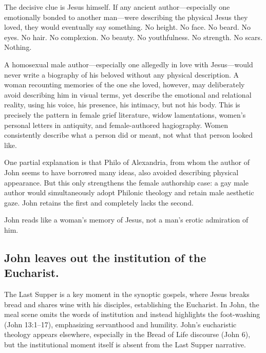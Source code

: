 The decisive clue is Jesus himself.
If any ancient author---especially one emotionally bonded to another man---were describing the physical Jesus they loved, they would eventually say something.
No height.
No face.
No beard.
No eyes.
No hair.
No complexion.
No beauty.
No youthfulness.
No strength.
No scars.
Nothing.

A homosexual male author---especially one allegedly in love with Jesus---would never write a biography of his beloved without any physical description.
A woman recounting memories of the one she loved, however, may deliberately avoid describing him in visual terms, yet describe the emotional and relational reality, using his voice, his presence, his intimacy, but not his body.
This is precisely the pattern in female grief literature, widow lamentations, women's personal letters in antiquity, and female-authored hagiography.
Women consistently describe what a person did or meant, not what that person looked like.

One partial explanation is that Philo of Alexandria, from whom the author of John seems to have borrowed many ideas, also avoided describing physical appearance.
But this only strengthens the female authorship case: a gay male author would simultaneously adopt Philonic theology and retain male aesthetic gaze.
John retains the first and completely lacks the second.

John reads like a woman's memory of Jesus, not a man's erotic admiration of him.

\subsection{John leaves out the institution of the Eucharist.}\label{subsec:john-leaves-out-the-institution-of-the-eucharist.}

The Last Supper is a key moment in the synoptic gospels, where Jesus breaks bread and shares wine with his disciples, establishing the Eucharist.
In John, the meal scene omits the words of institution and instead highlights the foot-washing (John 13:1--17), emphasizing servanthood and humility.
John's eucharistic theology appears elsewhere, especially in the Bread of Life discourse (John 6), but the institutional moment itself is absent from the Last Supper narrative.

